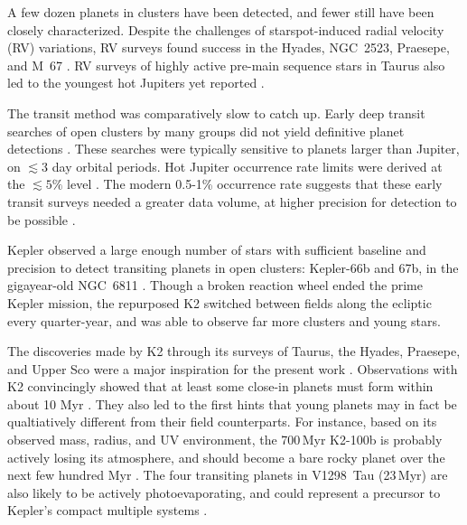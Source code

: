\documentclass[12pt,twocolumn,tighten]{aastex63}
\begin{document}
A few dozen planets in clusters have been detected, and fewer still
have been closely characterized.  Despite the challenges of
starspot-induced radial velocity (RV) variations, RV surveys found
success in the Hyades, NGC~2523, Praesepe, and M~67
\citep{Sato_et_al_2007,lovis_mayor_2007,Quinn_et_al_2012,Malavolta_et_al_2016,brucalassi_search_2017}.
RV surveys of highly active pre-main sequence stars in Taurus also led
to the youngest hot Jupiters yet reported
\citep{donati_hj_2016,johns-krull_candidate_2016,biddle_k2_2018,flagg_co_2019}.

The transit method was comparatively slow to catch up.  Early deep
transit searches of open clusters by many groups did not yield
definitive planet detections
\citep{mochejska_planets_2005,mochejska_planets_2006,burke_survey_2006,aigrain_monitor_2007,irwin_monitordata_2007,miller_monitor_2008,pepper_photometric_2008,hartman_MMT_IV_2009}.
These searches were typically sensitive to planets larger than
Jupiter, on $\lesssim 3$ day orbital periods.  Hot Jupiter occurrence
rate limits were derived at the $\lesssim 5\%$ level \citep[{\it
e.g.},][]{burke_survey_2006,hartman_MMT_IV_2009}.  The modern 0.5-1\%
occurrence rate suggests that these early transit surveys needed a
greater data volume, at higher precision for detection to be possible
\citep{mayor_harps_2011,wright_frequency_2012,howard_planet_2012,petigura_metallicity_2018}.

Kepler observed a large enough number of stars with sufficient
baseline and precision to detect transiting planets in open clusters:
Kepler-66b and 67b, in the gigayear-old NGC~6811
\citep{borucki_kepler_2010,Meibom_et_al_2013}.  Though a broken
reaction wheel ended the prime Kepler mission, the repurposed K2
\citep{howell_k2_2014} switched between fields along the ecliptic
every quarter-year, and was able to observe far more clusters and
young stars.

The discoveries made by K2 through its surveys of Taurus, the Hyades,
Praesepe, and Upper Sco were a major inspiration for the present work
\citep[{\it
e.g.},][]{Mann_K2_25_2016,obermeier_k2_2016,Mann_et_al_2017,vanderburg_zeitVII_2018,ciardi_k2-136_2018,livingston_three_2018,mann_ZEITVI_2018,rizzuto_zeitVIII_2018,livingston_k2-264_2019}.
Observations with K2 convincingly showed that at least some close-in
planets must form within about 10 Myr
\citep{Mann_K2_33b_2016,David_et_al_2017}.  They also led to the first
hints that young planets may in fact be qualtiatively different from
their field counterparts.  For instance, based on its observed mass,
radius, and UV environment, the 700$\,$Myr K2-100b is probably
actively losing its atmosphere, and should become a bare rocky planet
over the next few hundred Myr
\citep{Mann_et_al_2017,barragan_radial_2019}.  The four transiting
planets in V1298~Tau (23$\,$Myr) are also likely to be actively
photoevaporating, and could represent a precursor to Kepler's compact
multiple systems \citep{david_four_2019,david_warm_2019}.
\end{document}
